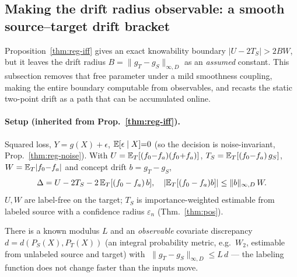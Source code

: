 
\subsection{Making the drift radius observable: a smooth source--target drift
bracket}\label{sec:smooth-drift}

Proposition~\ref{thm:reg-iff} gives an exact knowability boundary
$|U-2T_S|>2BW$, but it leaves the drift radius $B=\|g_T-g_S\|_{\infty,D}$ as an
\emph{assumed} constant. This subsection removes that free parameter under a
mild smoothness coupling, making the entire boundary computable from observables,
and recasts the static two-point drift as a path that can be accumulated online.

\paragraph{Setup (inherited from Prop.~\ref{thm:reg-iff}).} Squared loss,
$Y=g(X)+\epsilon$, $\mathbb{E}[\epsilon\mid X]{=}0$ (so the decision is noise-invariant,
Prop.~\ref{thm:reg-noise}). With $U=\mathbb{E}_T[(f_0{-}f_a)(f_0{+}f_a)]$,
$T_S=\mathbb{E}_T[(f_0{-}f_a)\,g_S]$, $W=\mathbb{E}_T|f_0{-}f_a|$ and concept drift
$b=g_T-g_S$,
\[
\Delta=U-2T_S-2\,\mathbb{E}_T[(f_0-f_a)\,b],\quad |\mathbb{E}_T[(f_0-f_a)b]|\le \|b\|_{\infty,D}\,W .
\]
$U,W$ are label-free on the target; $T_S$ is importance-weighted estimable from
labeled source with a confidence radius $\varepsilon_n$ (Thm.~\ref{thm:pos}).

\begin{definition}\label{def:drift-smooth}
There is a known modulus $L$ and an \emph{observable} covariate discrepancy
$d=d(P_S(X),P_T(X))$ (an integral probability metric, e.g.\ $W_2$, estimable
from unlabeled source and target) with
$\;\|g_T-g_S\|_{\infty,D}\le L\,d$ \;---\; the labeling function does not change
faster than the inputs move.
\end{definition}

